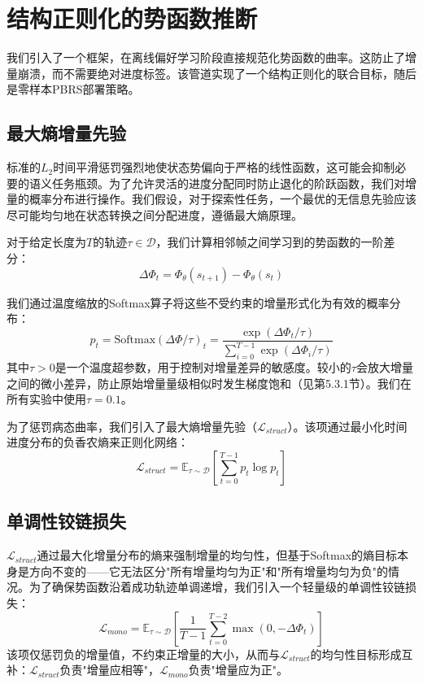 \clearpage
\section{结构正则化的势函数推断}

我们引入了一个框架，在离线偏好学习阶段直接规范化势函数的曲率。这防止了增量崩溃，而不需要绝对进度标签。该管道实现了一个结构正则化的联合目标，随后是零样本PBRS部署策略。

\subsection{最大熵增量先验}

标准的$L_2$时间平滑惩罚强烈地使状态势偏向于严格的线性函数，这可能会抑制必要的语义任务瓶颈。为了允许灵活的进度分配同时防止退化的阶跃函数，我们对增量的概率分布进行操作。我们假设，对于探索性任务，一个最优的无信息先验应该尽可能均匀地在状态转换之间分配进度，遵循最大熵原理\cite{shannon1948,jaynes1957}。

对于给定长度为$T$的轨迹$\tau \in \mathcal{D}$，我们计算相邻帧之间学习到的势函数的一阶差分：
\begin{equation}
\label{eq:delta_phi}
    \Delta\Phi_t = \Phi_\theta(s_{t+1}) - \Phi_\theta(s_t)
\end{equation}

我们通过温度缩放的Softmax算子将这些不受约束的增量形式化为有效的概率分布：
\begin{equation}
\label{eq:softmax}
    p_t = \text{Softmax}(\Delta\Phi / \tau)_t = \frac{\exp(\Delta\Phi_t / \tau)}{\sum_{i=0}^{T-1} \exp(\Delta\Phi_i / \tau)}
\end{equation}
其中$\tau > 0$是一个温度超参数，用于控制对增量差异的敏感度。较小的$\tau$会放大增量之间的微小差异，防止原始增量量级相似时发生梯度饱和（见第5.3.1节）。我们在所有实验中使用$\tau = 0.1$。

为了惩罚病态曲率，我们引入了最大熵增量先验（$\mathcal{L}_{struct}$）。该项通过最小化时间进度分布的负香农熵来正则化网络：
\begin{equation}
\label{eq:lstruct}
    \mathcal{L}_{struct} = \mathbb{E}_{\tau \sim \mathcal{D}} \left[ \sum_{t=0}^{T-1} p_t \log p_t \right]
\end{equation}

\subsection{单调性铰链损失}

$\mathcal{L}_{struct}$通过最大化增量分布的熵来强制增量的均匀性，但基于Softmax的熵目标本身是方向不变的——它无法区分"所有增量均匀为正"和"所有增量均匀为负"的情况。为了确保势函数沿着成功轨迹单调递增，我们引入一个轻量级的单调性铰链损失：
\begin{equation}
\label{eq:lmono}
    \mathcal{L}_{mono} = \mathbb{E}_{\tau \sim \mathcal{D}} \left[ \frac{1}{T-1}\sum_{t=0}^{T-2} \max(0, -\Delta\Phi_t) \right]
\end{equation}
该项仅惩罚负的增量值，不约束正增量的大小，从而与$\mathcal{L}_{struct}$的均匀性目标形成互补：$\mathcal{L}_{struct}$负责"增量应相等"，$\mathcal{L}_{mono}$负责"增量应为正"。


